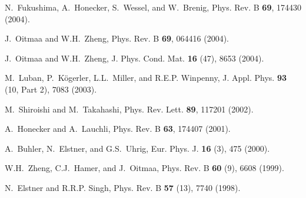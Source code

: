 \documentclass[aps,twocolumn,groupedaddress]{revtex4}
\begin{document}
\begin{thebibliography}{10}
N.~Fukushima, A.~Honecker, S.~Wessel, and W.~Brenig,
Phys. Rev. B {\bf 69}, 174430 (2004).

J.~Oitmaa and W.H.~Zheng,
Phys. Rev. B {\bf 69}, 064416 (2004).

J.~Oitmaa and W.H.~Zheng,
J. Phys. Cond. Mat. {\bf 16} (47), 8653 (2004).

M.~Luban, P.~K\"ogerler, L.L.~Miller, and R.E.P. Winpenny,
J. Appl. Phys. {\bf 93} (10, Part 2), 7083 (2003).

M.~Shiroishi and M.~Takahashi,
Phys. Rev. Lett. {\bf 89}, 117201 (2002).

A.~Honecker and A.~Lauchli,
Phys. Rev. B {\bf 63}, 174407 (2001).

A.~Buhler, N.~Elstner, and G.S.~Uhrig,
Eur. Phys. J. {\bf 16} (3), 475 (2000).

W.H.~Zheng, C.J.~Hamer, and J.~Oitmaa,
Phys. Rev. B {\bf 60} (9), 6608 (1999).

N.~Elstner and R.R.P. Singh,
Phys. Rev. B {\bf 57} (13), 7740 (1998).


\end{thebibliography}
\end{document}
